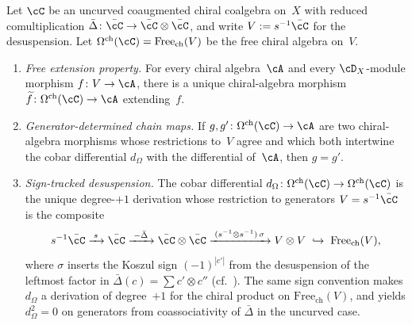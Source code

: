 \begin{lemma}
\label{lem:cobar-derivation-extension}
Let $\cC$ be an uncurved coaugmented chiral coalgebra on~$X$ with reduced
comultiplication
$\bar{\Delta} \colon \bar{\cC} \to \bar{\cC} \otimes \bar{\cC}$,
and write $V := s^{-1}\bar{\cC}$ for the desuspension. Let
$\Omega^{\mathrm{ch}}(\cC) = \mathrm{Free}_{\mathrm{ch}}(V)$ be the free
chiral algebra on~$V$.
\begin{enumerate}[label=\textup{(\roman*)}]
\item \emph{Free extension property.} For every chiral algebra~$\cA$ and every
$\cD_X$-module morphism $f \colon V \to \cA$, there is a unique
chiral-algebra morphism
$\widetilde{f} \colon \Omega^{\mathrm{ch}}(\cC) \to \cA$ extending~$f$.
\item \emph{Generator-determined chain maps.} If
$g, g' \colon \Omega^{\mathrm{ch}}(\cC) \to \cA$ are two chiral-algebra
morphisms whose restrictions to~$V$ agree and which both intertwine the
cobar differential $d_\Omega$ with the differential of~$\cA$, then $g = g'$.
\item \emph{Sign-tracked desuspension.} The cobar differential
$d_\Omega \colon \Omega^{\mathrm{ch}}(\cC) \to \Omega^{\mathrm{ch}}(\cC)$ is
the unique degree-$+1$ derivation whose restriction to generators
$V = s^{-1}\bar{\cC}$ is the composite
\[
s^{-1}\bar{\cC}
 \xrightarrow{\;s\;} \bar{\cC}
 \xrightarrow{\;-\bar{\Delta}\;}
 \bar{\cC} \otimes \bar{\cC}
 \xrightarrow{\;(s^{-1} \otimes s^{-1})\,\sigma\;}
 V \otimes V
 \;\hookrightarrow\;
 \mathrm{Free}_{\mathrm{ch}}(V),
\]
where $\sigma$ inserts the Koszul sign $(-1)^{|c'|}$ from the desuspension
of the leftmost factor in $\bar{\Delta}(c) = \sum c' \otimes c''$
\textup{(}cf.\ \cite[\S2.2.5]{LV12}\textup{)}. The same sign convention
makes $d_\Omega$ a derivation of degree~$+1$ for the chiral product on
$\mathrm{Free}_{\mathrm{ch}}(V)$, and yields $d_\Omega^2 = 0$ on
generators from coassociativity of $\bar{\Delta}$ in the uncurved case.
\end{enumerate}
\end{lemma}

